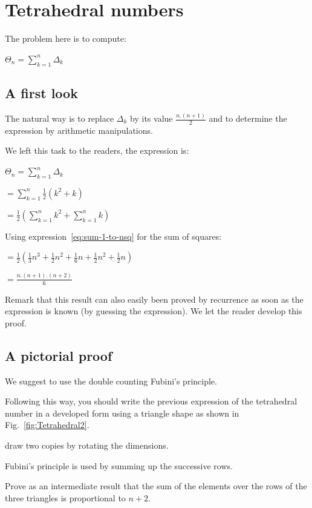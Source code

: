 \section{Tetrahedral numbers}
\label{sec:tetraedralNumbers}

The problem here is to compute:

$\Theta_n =  \sum_{k=1}^{n} \Delta_k$


\subsection{A first look}

The natural way is to replace $\Delta_k$ by its value $\frac{n.(n+1)}{2}$ and to determine the expression
by arithmetic manipulations.

We left this task to the readers, the expression is:

$\Theta_n =  \sum_{k=1}^{n} \Delta_k $

$=  \sum_{k=1}^{n} \frac{1}{2} (k^2 + k) $

$=  \frac{1}{2} (\sum_{k=1}^{n} k^2 + \sum_{k=1}^{n} k) $

Using expression~\ref{eq:sum-1-to-nsq} for the sum of squares:

$= \frac{1}{2} ( \frac{1}{3} n^3 + \frac{1}{2} n^2 + \frac{1}{6} n + \frac{1}{2} n^2 + \frac{1}{2} n )$

$= \frac{n.(n+1).(n+2)}{6}$

\medskip

Remark that this result can also easily been proved by recurrence as soon as the expression is known
(by guessing the expression).
We let the reader develop this proof. 


\subsection{A pictorial proof}

We suggest to use the double counting Fubini's principle.

Following this way, you should write the previous expression of the tetrahedral number in a developed form 
using a triangle shape as shown in Fig.~\ref{fig:Tetrahedral2}.

draw two copies by rotating the dimensions.

Fubini's principle is used by summing up the successive rows.

Prove as an intermediate result that the sum of the elements over the rows of the three triangles is proportional to $n+2$.
\medskip


